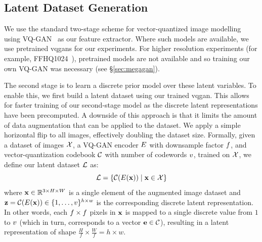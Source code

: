 

\subsection{Latent Dataset Generation}
We use the standard two-stage scheme for vector-quantized image
modelling~\cite{oord2018neural,razavi2019generating,esser2021taming,bondtaylor2021unleashing}
using VQ-GAN~\cite{esser2021taming} as our feature extractor. Where such models
are available, we use pretrained \glspl{vqgan} for our experiments. For higher
resolution experiments (for example, FFHQ1024~\cite{karras2019stylebased}),
pretrained models are not available and so training our own VQ-GAN was necessary
(see \S\ref{sec:megagan}).

The second stage is to learn a discrete prior model over these latent variables.
To enable this, we first build a latent dataset using our trained \gls{vqgan}.
This allows for faster training of our second-stage model as the discrete latent
representations have been precomputed. A downside of this approach is that it
limits the amount of data augmentation that can be applied to the dataset. We
apply a simple horizontal flip to all images, effectively doubling the dataset
size. Formally, given a dataset of images
$\mathcal{X}$, a VQ-GAN encoder $E$ with downsample factor
$f$, and vector-quantization codebook $\mathcal{C}$ with
number of codewords $v$, trained on $\mathcal{X}$, we define our
latent dataset $\mathcal{L}$ as:
\begin{equation}
    \mathcal{L} = \{\mathcal{C}(E(\mathbf{x})) \mid \mathbf{x} \in \mathcal{X} \}
\end{equation}
where $\mathbf{x} \in \mathbb{R}^{3 \times H \times W}$ is a single element of the
augmented image
dataset and $\mathbf{z} = \mathcal{C}(E(\mathbf{x})) \in \{1, \dots,
v\}^{h \times w}$ is the corresponding discrete latent
representation. In other words, each $f \times f$
pixels in $\mathbf{x}$ is mapped to a single discrete value from $1$ to
$v$ (which in turn, corresponds to a vector $\mathbf{e} \in
\mathcal{C}$),
resulting in a latent representation of shape $\frac{H}{f} \times \frac{W}{f} =
h \times w$.

